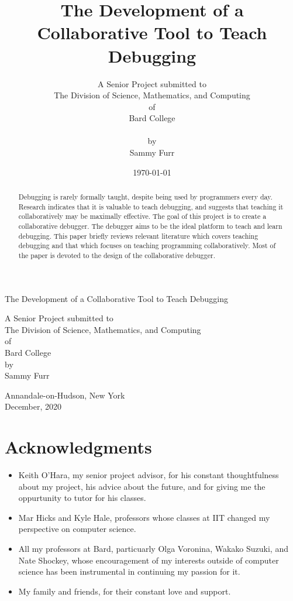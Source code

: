 \documentclass[12pt]{article}
\author{A Senior Project submitted to\\The Division of Science, Mathematics, and Computing\\of\\Bard College\\\\by\\Sammy Furr}
\title{The Development of a Collaborative Tool to Teach Debugging}
\date{\today}
\begin{document}
\begin{titlepage}
  \linespread{1}
    \begin{center}
            
        \Huge
        The Development of a Collaborative Tool to Teach Debugging
        
        \vspace{4cm}
       
        \large
        A Senior Project submitted to\\
        The Division of Science, Mathematics, and Computing\\
        of\\
        Bard College\\
        \vspace{1cm}
        by\\
        Sammy Furr
        \vfill
            
        Annandale-on-Hudson, New York\\
        December, 2020
    \end{center}
\end{titlepage}

\begin{abstract}
  \linespread{1}
  Debugging is rarely formally taught, despite being used by
  programmers every day.  Research indicates that it is valuable to
  teach debugging, and suggests that teaching it collaboratively may
  be maximally effective.  The goal of this project is to create a
  collaborative debugger.  The debugger aims to be the ideal platform
  to teach and learn debugging.  This paper briefly reviews relevant
  literature which covers teaching debugging and that which focuses on
  teaching programming collaboratively.  Most of the paper is devoted
  to the design of the collaborative debugger.
\end{abstract}

\section{Acknowledgments}

\begin{itemize}
\item Keith O'Hara, my senior project advisor, for his constant
  thoughtfulness about my project, his advice about the future, and
  for giving me the oppurtunity to tutor for his classes.
\item Mar Hicks and Kyle Hale, professors whose classes at IIT changed
  my perspective on computer science.
\item All my professors at Bard, particuarly Olga Voronina, Wakako
  Suzuki, and Nate Shockey, whose encouragement of my interests
  outside of computer science has been instrumental in continuing my
  passion for it.
\item My family and friends, for their constant love and support.
\end{itemize}
\end{document}
